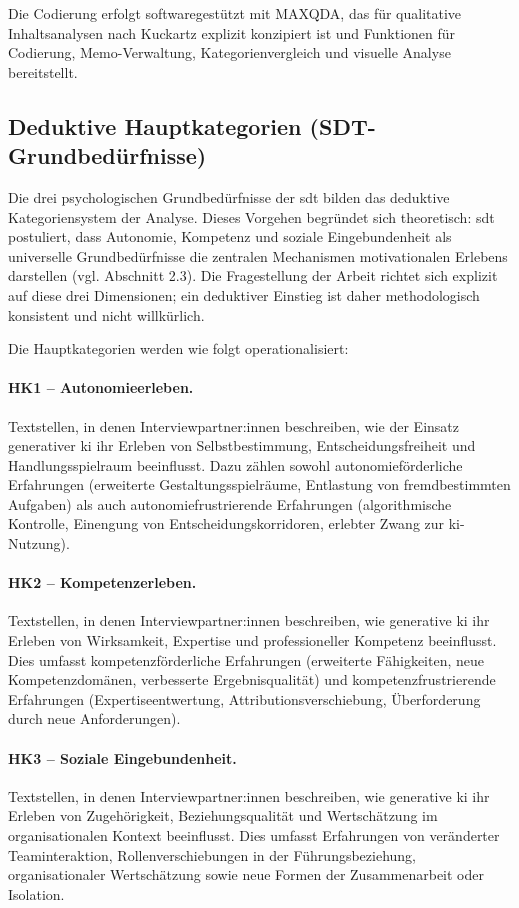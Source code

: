 Die Codierung erfolgt softwaregestützt mit MAXQDA, das für qualitative Inhaltsanalysen nach Kuckartz explizit konzipiert ist und Funktionen für Codierung, Memo-Verwaltung, Kategorienvergleich und visuelle Analyse bereitstellt.


\subsection{Deduktive Hauptkategorien (SDT-Grundbedürfnisse)}

Die drei psychologischen Grundbedürfnisse der \gls{sdt} bilden das deduktive Kategoriensystem der Analyse. Dieses Vorgehen begründet sich theoretisch: \gls{sdt} postuliert, dass Autonomie, Kompetenz und soziale Eingebundenheit als universelle Grundbedürfnisse die zentralen Mechanismen motivationalen Erlebens darstellen (vgl. Abschnitt 2.3). Die Fragestellung der Arbeit richtet sich explizit auf diese drei Dimensionen; ein deduktiver Einstieg ist daher methodologisch konsistent und nicht willkürlich.

Die Hauptkategorien werden wie folgt operationalisiert:

\paragraph{HK1 -- Autonomieerleben.} Textstellen, in denen Interviewpartner:innen beschreiben, wie der Einsatz generativer \gls{ki} ihr Erleben von Selbstbestimmung, Entscheidungsfreiheit und Handlungsspielraum beeinflusst. Dazu zählen sowohl autonomieförderliche Erfahrungen (erweiterte Gestaltungsspielräume, Entlastung von fremdbestimmten Aufgaben) als auch autonomiefrustrierende Erfahrungen (algorithmische Kontrolle, Einengung von Entscheidungskorridoren, erlebter Zwang zur \acrshort{ki}-Nutzung).

\paragraph{HK2 -- Kompetenzerleben.} Textstellen, in denen Interviewpartner:innen beschreiben, wie generative \gls{ki} ihr Erleben von Wirksamkeit, Expertise und professioneller Kompetenz beeinflusst. Dies umfasst kompetenzförderliche Erfahrungen (erweiterte Fähigkeiten, neue Kompetenzdomänen, verbesserte Ergebnisqualität) und kompetenzfrustrierende Erfahrungen (Expertiseentwertung, Attributionsverschiebung, Überforderung durch neue Anforderungen).

\paragraph{HK3 -- Soziale Eingebundenheit.} Textstellen, in denen Interviewpartner:innen beschreiben, wie generative \gls{ki} ihr Erleben von Zugehörigkeit, Beziehungsqualität und Wertschätzung im organisationalen Kontext beeinflusst. Dies umfasst Erfahrungen von veränderter Teaminteraktion, Rollenverschiebungen in der Führungsbeziehung, organisationaler Wertschätzung sowie neue Formen der Zusammenarbeit oder Isolation.

